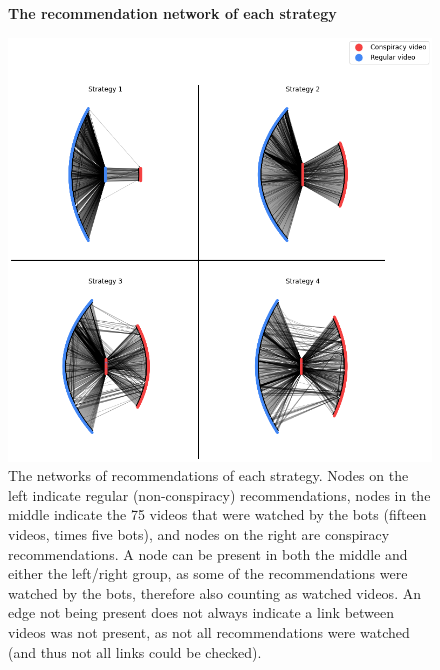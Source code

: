 \documentclass[../main.tex]{subfiles}
\begin{document}
\begin{figure}
  \textbf{The recommendation network of each strategy}\par\medskip
  \centering
  \includegraphics[keepaspectratio, width=\textwidth]{images/recommendation networks.png}
  \caption{The networks of recommendations of each strategy. Nodes on the left indicate regular (non-conspiracy) recommendations, nodes in the middle indicate the 75 videos that were watched by the bots (fifteen videos, times five bots), and nodes on the right are conspiracy recommendations. A node can be present in both the middle and either the left/right group, as some of the recommendations were watched by the bots, therefore also counting as watched videos. An edge not being present does not always indicate a link between videos was not present, as not all recommendations were watched (and thus not all links could be checked).}
  \label{fig:rec_net}
\end{figure}

\newpage
\end{document}

